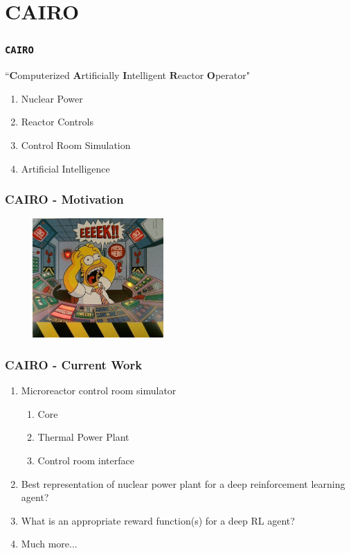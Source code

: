 	\section{CAIRO}

	\begin{frame}
		\frametitle{\texttt{CAIRO}}
		``$\textbf{C}$omputerized $\textbf{A}$rtificially $\textbf{I}$ntelligent $\textbf{R}$eactor $\textbf{O}$perator"\\
		\begin{enumerate}
			\item Nuclear Power
			\item Reactor Controls
			\item Control Room Simulation
			\item Artificial Intelligence
		\end{enumerate}
	\end{frame}

	\begin{frame}
		\frametitle{CAIRO - Motivation}
		\begin{figure}
			\includegraphics[width=5cm]{homer-reactor.jpg}
		\end{figure}
	\end{frame}
	\begin{frame}
		\frametitle{CAIRO - Current Work}
		\begin{enumerate}
			\item Microreactor control room simulator
			\begin{enumerate}
				\item Core
				\item Thermal Power Plant
				\item Control room interface
			\end{enumerate}
			\item Best representation of nuclear power plant for a deep reinforcement learning agent?
			\item What is an appropriate reward function(s) for a deep RL agent?
			\item Much more... 
		\end{enumerate}
	\end{frame}



% 
